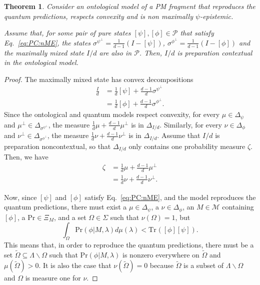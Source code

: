 \documentclass[DIV=calc,paper=a4,fontsize=11pt,twocolumn]{scrartcl} %
\theoremstyle{definition}
\theoremstyle{plain}
\newtheorem{theorem}[definition]{Theorem}
\newcommand{\Proj}[1]{\ensuremath{\left [ #1 \right ]}}
\newcommand{\Tr}[2][]{\ensuremath{\text{Tr}_{#1} \left ( #2 \right )}}
\begin{document}
\begin{theorem}
\label{prop:PC:PC}
Consider an ontological model of a PM fragment that reproduces the
quantum predictions, respects convexity and is non maximally
$\psi$-epistemic.

Assume that, for some pair of pure states $\Proj{\psi}, \Proj{\phi}
\in \mathcal{P}$ that satisfy Eq.~\eqref{eq:PC:nME}, the states
$\sigma^{\psi^{\perp}} = \frac{1}{d-1} \left ( I - \Proj{\psi}
\right )$, $\sigma^{\phi^{\perp}} = \frac{1}{d-1} \left ( I -
\Proj{\phi} \right )$ and the maximally mixed state $I/d$ are also
in $\mathcal{P}$.  Then, $I/d$ is preparation contextual in the
ontological model.
\end{theorem}
\begin{proof}
The maximally mixed state has convex decompositions
\begin{align}
\frac{I}{d} & = \frac{1}{d} \Proj{\psi} + \frac{d-1}{d}
\sigma^{\psi^{\perp}} \\
& = \frac{1}{d} \Proj{\phi} + \frac{d-1}{d} \sigma^{\phi^{\perp}}.
\end{align}
Since the ontological and quantum models respect convexity, for
every $\mu \in \Delta_{\psi}$ and $\mu^{\perp} \in
\Delta_{\sigma^{\psi^{\perp}}}$, the measure $\frac{1}{d} \mu +
\frac{d-1}{d}\mu^{\perp}$ is in $\Delta_{I/d}$.  Similarly, for
every $\nu \in \Delta_{\phi}$ and $\nu^{\perp} \in
\Delta_{\sigma^{\phi^{\perp}}}$, the measure $\frac{1}{d} \nu +
\frac{d-1}{d}\nu^{\perp}$ is in $\Delta_{I/d}$.  Assume that $I/d$
is preparation noncontextual, so that $\Delta_{I/d}$ only contains
one probability measure $\zeta$.  Then, we have
\begin{align}
\zeta & = \frac{1}{d} \mu + \frac{d-1}{d} \mu^{\perp} \\
& = \frac{1}{d} \nu + \frac{d-1}{d} \nu^{\perp}.
\end{align}

Now, since $\Proj{\psi}$ and $\Proj{\phi}$ satisfy
Eq.~\eqref{eq:PC:nME}, and the model reproduces the quantum
predictions, there must exist a $\mu \in \Delta_{\psi}$, a $\nu \in
\Delta_{\phi}$, an $M \in \mathcal{M}$ containing $\Proj{\phi}$, a
$\text{Pr} \in \Xi_M$, and a set $\Omega \in \Sigma$ such that
$\nu(\Omega) = 1$, but
\begin{equation}
\int_{\Omega} \text{Pr}(\phi|M,\lambda) d\mu(\lambda) <
\Tr{\Proj{\phi}\Proj{\psi}}.
\end{equation}
This means that, in order to reproduce the quantum predictions,
there must be a set $\tilde{\Omega} \subseteq \Lambda \backslash
\Omega$ such that $\text{Pr}(\phi|M,\lambda)$ is nonzero everywhere on
$\tilde{\Omega}$ and $\mu(\tilde{\Omega}) > 0$.  It is also the case
that $\nu(\tilde{\Omega}) = 0$ because $\tilde{\Omega}$ is a subset
of $\Lambda \backslash \Omega$ and $\Omega$ is measure one for
$\nu$.


\end{proof}
\end{document}
